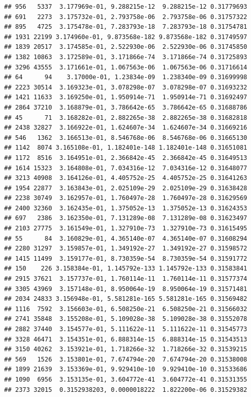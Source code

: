 \documentclass[
]{article}
\begin{document}
\begin{verbatim}
## 956   5337  3.177969e-01, 9.288215e-12  9.288215e-12 0.31779693
## 691   2273  3.175732e-01, 2.793758e-06  2.793758e-06 0.31757322
## 895   4725  3.175478e-01, 7.283793e-18  7.283793e-18 0.31754781
## 1931 22199 3.174960e-01, 9.873568e-182 9.873568e-182 0.31749597
## 1839 20517  3.174585e-01, 2.522930e-06  2.522930e-06 0.31745850
## 1382 10863  3.172589e-01, 3.171866e-74  3.171866e-74 0.31725893
## 3296 43555  3.171661e-01, 1.067563e-06  1.067563e-06 0.31716614
## 64      94    3.17000e-01, 1.23834e-09  1.238340e-09 0.31699998
## 2223 30514  3.169323e-01, 3.078298e-07  3.078298e-07 0.31693232
## 1421 11633  3.169250e-01, 1.950914e-71  1.950914e-71 0.31692497
## 2864 37210  3.168879e-01, 3.786642e-65  3.786642e-65 0.31688786
## 45      71  3.168282e-01, 2.882265e-38  2.882265e-38 0.31682818
## 2438 32827  3.166922e-01, 1.624607e-34  1.624607e-34 0.31669216
## 546   1362  3.166513e-01, 8.546768e-06  8.546768e-06 0.31665130
## 1142  8074 3.165108e-01, 1.182401e-148 1.182401e-148 0.31651081
## 1172  8516  3.164951e-01, 2.366842e-45  2.366842e-45 0.31649513
## 1614 15323  3.164808e-01, 7.034316e-12  7.034316e-12 0.31648077
## 3213 40908  3.164126e-01, 4.405752e-25  4.405752e-25 0.31641263
## 1954 22877  3.163843e-01, 2.025109e-29  2.025109e-29 0.31638428
## 2238 30749  3.162957e-01, 1.760497e-28  1.760497e-28 0.31629569
## 2400 32360  3.162435e-01, 1.375052e-13  1.375052e-13 0.31624353
## 697   2386  3.162350e-01, 7.131289e-08  7.131289e-08 0.31623497
## 2103 27775  3.161549e-01, 1.327910e-73  1.327910e-73 0.31615495
## 55      84  3.160829e-01, 4.365140e-07  4.365140e-07 0.31608294
## 2280 31297  3.159857e-01, 1.349192e-27  1.349192e-27 0.31598572
## 1415 11499  3.159177e-01, 8.730359e-54  8.730359e-54 0.31591772
## 150    226 3.158384e-01, 1.145792e-133 1.145792e-133 0.31583841
## 2915 37621  3.157737e-01, 1.760114e-11  1.760114e-11 0.31577374
## 3305 43969  3.157148e-01, 8.950064e-19  8.950064e-19 0.31571481
## 2034 24833 3.156948e-01, 5.581281e-165 5.581281e-165 0.31569482
## 1116  7592  3.156603e-01, 6.508250e-21  6.508250e-21 0.31566032
## 2741 35848  3.155208e-01, 5.109028e-38  5.109028e-38 0.31552078
## 2882 37440  3.154577e-01, 5.111622e-11  5.111622e-11 0.31545773
## 3328 46471  3.154351e-01, 6.888314e-15  6.888314e-15 0.31543513
## 3150 40262  3.153921e-01, 1.718266e-32  1.718266e-32 0.31539215
## 569   1526  3.153801e-01, 7.674794e-20  7.674794e-20 0.31538008
## 1899 21639  3.153369e-01, 9.929410e-10  9.929410e-10 0.31533686
## 1090  6956  3.153135e-01, 3.604772e-41  3.604772e-41 0.31531355
## 2373 32015  0.3152938203, 0.0000018222  1.822200e-06 0.31529382

\end{verbatim}
\end{document}
